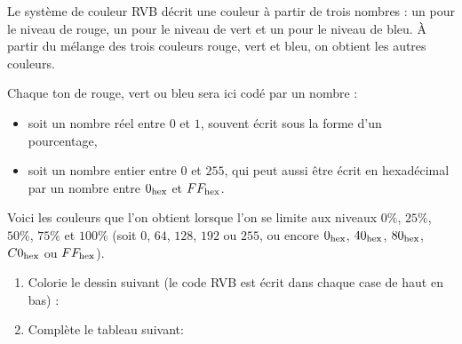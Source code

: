 \documentclass[class=report,crop=false, 12pt]{standalone}
\begin{document}
\begin{activite}
Le système de couleur RVB décrit une couleur à partir de trois nombres : un pour le niveau de rouge, un pour le niveau de vert et un pour le niveau de bleu.
\`A partir du mélange des trois couleurs rouge, vert et bleu, on obtient les autres couleurs.

\begin{minipage}{0.49\textwidth}
\end{minipage}
\begin{minipage}{0.49\textwidth}
\end{minipage}


Chaque ton de rouge, vert ou bleu sera ici codé par un nombre :
\begin{itemize}
  \item soit un nombre réel entre $0$ et $1$, souvent écrit sous la forme d'un pourcentage,
  \item soit un nombre entier entre $0$ et $255$, qui peut aussi être écrit en hexadécimal par un nombre entre $0_{\text{hex}}$ et $FF_{\text{hex}}$.
\end{itemize}

Voici les couleurs que l'on obtient lorsque l'on se limite aux niveaux $0\%$, $25\%$,
$50\%$, $75\%$ et $100\%$ (soit $0$, $64$, $128$, $192$ ou $255$, ou encore 
$0_{\text{hex}}$, $40_{\text{hex}}$, $80_{\text{hex}}$, $C0_{\text{hex}}$ ou $FF_{\text{hex}}$).




\begin{enumerate}

  \item Colorie le dessin suivant (le code RVB  est écrit dans chaque case de haut en bas) :
  

  \item Complète le tableau suivant: 


\end{enumerate}
\end{activite}
\end{document}

